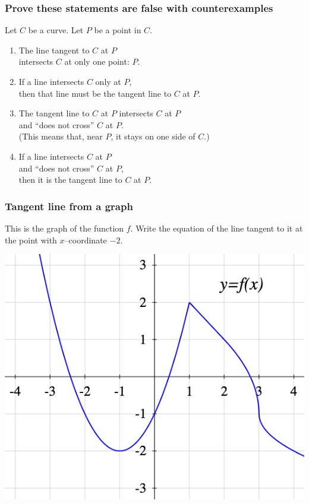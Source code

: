 \begin{frame}
	\frametitle{Prove these statements are false with counterexamples}

	Let $C$ be a curve. Let $P$ be a point in $C$.
	\vfill
	\begin{enumerate}
		\item The line tangent to $C$ at $P$ \\ intersects $C$ at only one point:
			$P$.
			\vfill

		\item If a line intersects $C$ only at $P$, \\ then that line must be the
			tangent line to $C$ at $P$.
			\vfill

		\item The tangent line to $C$ at $P$ intersects $C$ at $P$ \\ and ``does not
			cross'' $C$ at $P$. \\ (This means that, near $P$, it stays on one side of
			$C$.)
			\vfill

		\item If a line intersects $C$ at $P$ \\ and ``does not cross'' $C$ at $P$,
			\\ then it is the tangent line to $C$ at $P$.
			\vfill
	\end{enumerate}
\end{frame}

\begin{frame}[t]
	\frametitle{Tangent line from a graph}
	This is the graph of the function $f$. Write the equation of the line tangent
	to it at the point with $x$--coordinate $-2$.
	\begin{center}
		\includegraphics[scale=.4]{G4}
	\end{center}
\end{frame}

